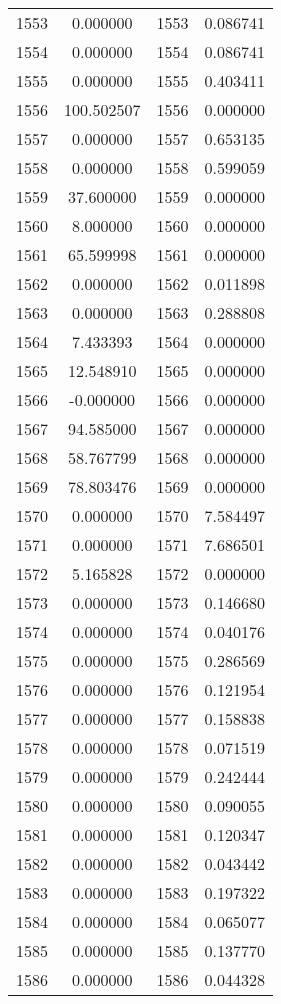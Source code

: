 \documentclass[12pt]{article}
\begin{document}
\begin{longtable}{@{}cccc@{}}
1553 & 0.000000 & 1553 & 0.086741 \\
1554 & 0.000000 & 1554 & 0.086741 \\
1555 & 0.000000 & 1555 & 0.403411 \\
1556 & 100.502507 & 1556 & 0.000000 \\
1557 & 0.000000 & 1557 & 0.653135 \\
1558 & 0.000000 & 1558 & 0.599059 \\
1559 & 37.600000 & 1559 & 0.000000 \\
1560 & 8.000000 & 1560 & 0.000000 \\
1561 & 65.599998 & 1561 & 0.000000 \\
1562 & 0.000000 & 1562 & 0.011898 \\
1563 & 0.000000 & 1563 & 0.288808 \\
1564 & 7.433393 & 1564 & 0.000000 \\
1565 & 12.548910 & 1565 & 0.000000 \\
1566 & -0.000000 & 1566 & 0.000000 \\
1567 & 94.585000 & 1567 & 0.000000 \\
1568 & 58.767799 & 1568 & 0.000000 \\
1569 & 78.803476 & 1569 & 0.000000 \\
1570 & 0.000000 & 1570 & 7.584497 \\
1571 & 0.000000 & 1571 & 7.686501 \\
1572 & 5.165828 & 1572 & 0.000000 \\
1573 & 0.000000 & 1573 & 0.146680 \\
1574 & 0.000000 & 1574 & 0.040176 \\
1575 & 0.000000 & 1575 & 0.286569 \\
1576 & 0.000000 & 1576 & 0.121954 \\
1577 & 0.000000 & 1577 & 0.158838 \\
1578 & 0.000000 & 1578 & 0.071519 \\
1579 & 0.000000 & 1579 & 0.242444 \\
1580 & 0.000000 & 1580 & 0.090055 \\
1581 & 0.000000 & 1581 & 0.120347 \\
1582 & 0.000000 & 1582 & 0.043442 \\
1583 & 0.000000 & 1583 & 0.197322 \\
1584 & 0.000000 & 1584 & 0.065077 \\
1585 & 0.000000 & 1585 & 0.137770 \\
1586 & 0.000000 & 1586 & 0.044328 \\

\end{longtable}
\end{document}
